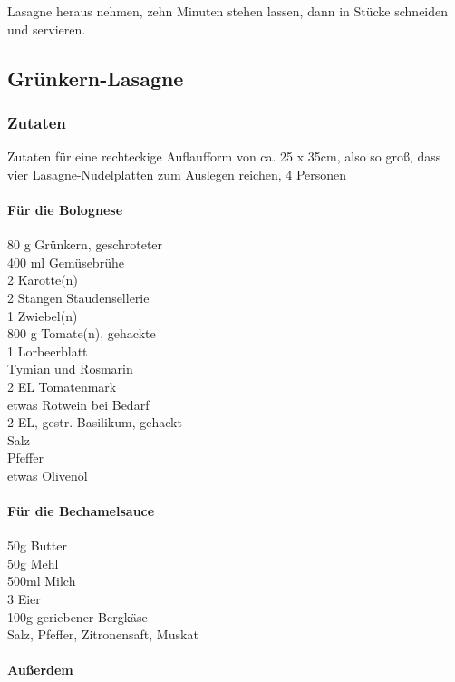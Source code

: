 Lasagne heraus nehmen, zehn Minuten stehen lassen, dann in Stücke schneiden und servieren.

\subsection{Grünkern-Lasagne}

\subsubsection*{Zutaten} 
Zutaten für eine rechteckige Auflaufform von ca. 25 x 35cm, also so groß, dass vier Lasagne-Nudelplatten zum Auslegen reichen, 4 Personen

\paragraph*{Für die Bolognese}

80 g 	Grünkern, geschroteter\\
400 ml 	Gemüsebrühe\\
2  	Karotte(n)\\
2 Stangen Staudensellerie\\
1  	Zwiebel(n)\\
800 g 	Tomate(n), gehackte\\
1 Lorbeerblatt\\
Tymian und Rosmarin\\
2 EL 	Tomatenmark\\
etwas 	Rotwein bei Bedarf\\
2 EL, gestr. Basilikum, gehackt\\
Salz\\
Pfeffer\\
etwas 	Olivenöl 

\paragraph*{Für die Bechamelsauce}
50g Butter\\
50g Mehl\\
500ml Milch\\
3 Eier\\
100g geriebener Bergkäse\\
Salz, Pfeffer, Zitronensaft, Muskat

\paragraph*{Außerdem}

